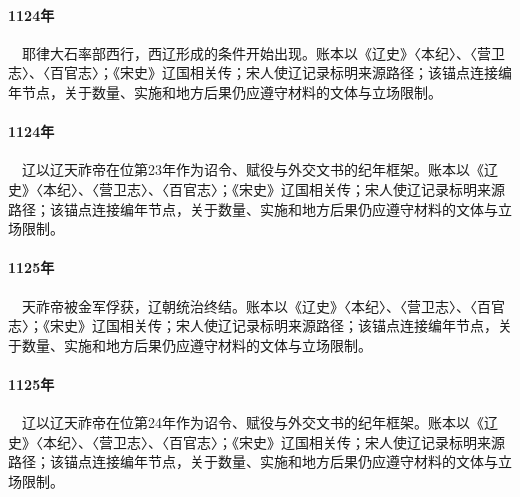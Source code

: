 \paragraph{1124年}　耶律大石率部西行，西辽形成的条件开始出现。账本以《辽史》〈本纪〉、〈营卫志〉、〈百官志〉；《宋史》辽国相关传；宋人使辽记录标明来源路径；该锚点连接编年节点，关于数量、实施和地方后果仍应遵守材料的文体与立场限制。

\paragraph{1124年}　辽以辽天祚帝在位第23年作为诏令、赋役与外交文书的纪年框架。账本以《辽史》〈本纪〉、〈营卫志〉、〈百官志〉；《宋史》辽国相关传；宋人使辽记录标明来源路径；该锚点连接编年节点，关于数量、实施和地方后果仍应遵守材料的文体与立场限制。

\paragraph{1125年}　天祚帝被金军俘获，辽朝统治终结。账本以《辽史》〈本纪〉、〈营卫志〉、〈百官志〉；《宋史》辽国相关传；宋人使辽记录标明来源路径；该锚点连接编年节点，关于数量、实施和地方后果仍应遵守材料的文体与立场限制。

\paragraph{1125年}　辽以辽天祚帝在位第24年作为诏令、赋役与外交文书的纪年框架。账本以《辽史》〈本纪〉、〈营卫志〉、〈百官志〉；《宋史》辽国相关传；宋人使辽记录标明来源路径；该锚点连接编年节点，关于数量、实施和地方后果仍应遵守材料的文体与立场限制。
